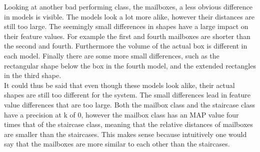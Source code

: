 \documentclass{bigdata}
\begin{document}
Looking at another bad performing class, the mailboxes, a less obvious difference in models is visible. The models look a lot more alike, however their distances are still too large. The seemingly small differences in shapes have a large impact on their feature values. For example the first and fourth mailboxes are shorter than the second and fourth. Furthermore the volume of the actual box is different in each model. Finally there are some more small differences, such as the rectangular shape below the box in the fourth model, and the extended rectangles in the third shape. \\
It could thus be said that even though these models look alike, their actual shapes are still too different for the system. The small differences lead in feature value differences that are too large. Both the mailbox class and the staircase class have a precision at k of 0, however the mailbox class has an MAP value four times that of the staircase class, meaning that the relative distances of mailboxes are smaller than the staircases. This makes sense because intuitively one would say that the mailboxes are more similar to each other than the staircases. 
\end{document}
